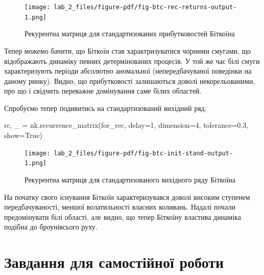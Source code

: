 \documentclass[
  letterpaper,
]{report}
\newenvironment{Shaded}{\begin{snugshade}}{\end{snugshade}}
\newcommand{\DecValTok}[1]{\textcolor[rgb]{0.68,0.00,0.00}{#1}}
\newcommand{\FloatTok}[1]{\textcolor[rgb]{0.68,0.00,0.00}{#1}}
\newcommand{\NormalTok}[1]{\textcolor[rgb]{0.00,0.23,0.31}{#1}}
\newcommand{\OperatorTok}[1]{\textcolor[rgb]{0.37,0.37,0.37}{#1}}
\newcommand{\VariableTok}[1]{\textcolor[rgb]{0.07,0.07,0.07}{#1}}
\begin{document}
\begin{figure}[H]

{\centering \texttt{[image: lab\_2\_files/figure-pdf/fig-btc-rec-returns-output-1.png]}

}

\caption{\label{fig-btc-rec-returns}Рекурентна матриця для
стандартизованих прибутковостей Біткоїна}

\end{figure}

Тепер можемо бачити, що Біткоїн став характризуватися чорними смугами,
що відображають динаміку певних детермінованих процесів. У той же час
білі смуги характеризують періоди абсолютно аномальної (непередбачуваної
поведінки на даному ринку). Видно, що прибутковості залишаються доволі
некорельованими, про що і свідчить переважне домінування саме білих
областей.

Спробуємо тепер подивитись на стандартизований вихідний ряд.

\begin{Shaded}
\begin{Highlighting}[]
\NormalTok{rc, \_ }\OperatorTok{=}\NormalTok{ nk.recurrence\_matrix(for\_rec, }
\NormalTok{                            delay}\OperatorTok{=}\DecValTok{1}\NormalTok{, }
\NormalTok{                            dimension}\OperatorTok{=}\DecValTok{4}\NormalTok{,}
\NormalTok{                            tolerance}\OperatorTok{=}\FloatTok{0.3}\NormalTok{,}
\NormalTok{                            show}\OperatorTok{=}\VariableTok{True}\NormalTok{)}
\end{Highlighting}
\end{Shaded}

\begin{figure}[H]

{\centering \texttt{[image: lab\_2\_files/figure-pdf/fig-btc-init-stand-output-1.png]}

}

\caption{\label{fig-btc-init-stand}Рекурентна матриця для
стандартизованого вихідного ряду Біткоїна}

\end{figure}

На початку свого існування Біткоїн характеризувався доволі високим
ступенем передбачуваності, меншої волатильності власних коливань. Надалі
почали предомінувати білі області, але видно, що тепер Біткоїну властива
динаміка подібна до броунівсього руху.

\hypertarget{ux437ux430ux432ux434ux430ux43dux43dux44f-ux434ux43bux44f-ux441ux430ux43cux43eux441ux442ux456ux439ux43dux43eux457-ux440ux43eux431ux43eux442ux438-1}{%
\section{Завдання для самостійної
роботи}\label{ux437ux430ux432ux434ux430ux43dux43dux44f-ux434ux43bux44f-ux441ux430ux43cux43eux441ux442ux456ux439ux43dux43eux457-ux440ux43eux431ux43eux442ux438-1}}
\end{document}
